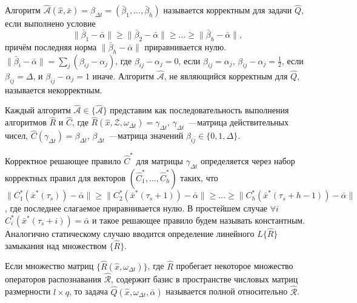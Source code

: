 \begin{Def}
	Алгоритм $\hat{\mathcal{A}}(\hat{x},\bar{x})=\beta_{\Delta{t}}=(\bar{\beta}_1,\dots,\bar{\beta}_h)$ называется корректным для задачи $\hat{Q}$, если выполнено условие
	\begin{equation}
		\|\bar{\beta}_1-\bar{\alpha}\|\geqslant\|\bar{\beta}_2-\bar{\alpha}\|\geqslant\dots\geqslant\|\bar{\beta}_h-\bar{\alpha}\|,
	\end{equation}
	причём последняя норма $\|\bar{\beta}_h-\bar{\alpha}\|$ приравнивается нулю.
	$\|\bar{\beta}_i-\bar{\alpha}\|=
	\sum_j{(\beta_{ij}-\alpha_j)}$, где $\beta_{ij}-\alpha_j=0$, если $\beta_{ij}=\alpha_j$, $\beta_{ij}-\alpha_j=\frac{1}{2}$, если $\beta_{ij}=\Delta$, и $\beta_{ij}-\alpha_j=1$ иначе. Алгоритм $\hat{\mathcal{A}}$, не являющийся корректным для $\hat{Q}$, называется некорректным.
\end{Def}

\begin{Pred}
	\label{st:decompositon_dyn}
	Каждый алгоритм $\hat{\mathcal{A}}\in\{\hat{\mathcal{A}}\}$ представим как последовательность выполнения алгоритмов $\hat{R}$ и $\hat{C}$, где $\hat{R}(\hat{x}, \mathcal{Z}, \omega_{\Delta{t}})=\gamma_{\Delta{t}}$, $\gamma_{\Delta{t}}$~---матрица действительных чисел, $\hat{C}(\gamma_{\Delta{t}})=\beta_{\Delta{t}}$, $\beta_{\Delta{t}}$~---матрица значений $\beta_{ij}\in\{0,1,\Delta\}$.
\end{Pred}

Корректное решающее правило $\hat{C}^*$ для матрицы $\gamma_{\Delta{t}}$ определяется через набор корректных правил для векторов $(
\hat{C}_1^*, \dots, \hat{C}_h^*)$ таких, что $\|C_1^*(\bar{x}^*(\tau_s))-\bar{\alpha}\|\geqslant\|C_2^*(\bar{x}^*(\tau_s+1))-\bar{\alpha}\|\geqslant\dots\geqslant\|C_h^*(\bar{x}^*(\tau_s+h-1))-\bar{\alpha}\|$, где последнее слагаемое приравнивается нулю.  В простейшем случае $\forall{i}$ $C_i^*(\bar{x}^*(\tau_s+i))=\bar{\alpha}$ и такое решающее правило будем называть константным. Аналогично статическому случаю вводится определение линейного $L\{\hat{R}\}$ замыкания над множеством $\{\hat{R}\}$. 

\begin{Def}
	Если множество матриц $\{\hat R(\hat x,\omega_{\Delta t})\}$, где $\hat R$ пробегает некоторое множество операторов распознавания $\hat{\mathcal R}$, содержит базис в пространстве числовых матриц размерности $l\times q$, то задача $\hat Q(\hat x,\omega_{\Delta t},\bar{\alpha})$ называется полной относительно $\hat{\mathcal R}$.
\end{Def}

